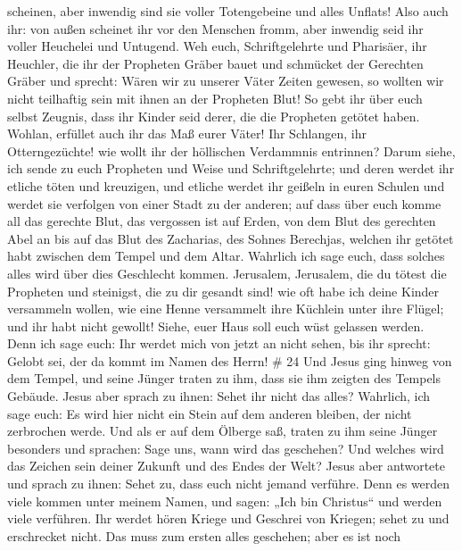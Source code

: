 scheinen, aber inwendig sind sie voller Totengebeine und alles Unflats!
 Also auch ihr: von außen scheinet ihr vor den Menschen
fromm, aber inwendig seid ihr voller Heuchelei und Untugend.
 Weh euch, Schriftgelehrte und Pharisäer, ihr Heuchler, die
ihr der Propheten Gräber bauet und schmücket der Gerechten Gräber
 und sprecht: Wären wir zu unserer Väter Zeiten gewesen, so
wollten wir nicht teilhaftig sein mit ihnen an der Propheten Blut!
 So gebt ihr über euch selbst Zeugnis, dass ihr Kinder seid
derer, die die Propheten getötet haben.  Wohlan, erfüllet
auch ihr das Maß eurer Väter!  Ihr Schlangen, ihr
Otterngezüchte! wie wollt ihr der höllischen Verdammnis entrinnen?
 Darum siehe, ich sende zu euch Propheten und Weise und
Schriftgelehrte; und deren werdet ihr etliche töten und kreuzigen, und
etliche werdet ihr geißeln in euren Schulen und werdet sie verfolgen von
einer Stadt zu der anderen;  auf dass über euch komme all
das gerechte Blut, das vergossen ist auf Erden, von dem Blut des
gerechten Abel an bis auf das Blut des Zacharias, des Sohnes Berechjas,
welchen ihr getötet habt zwischen dem Tempel und dem Altar.
 Wahrlich ich sage euch, dass solches alles wird über dies
Geschlecht kommen.  Jerusalem, Jerusalem, die du tötest die
Propheten und steinigst, die zu dir gesandt sind! wie oft habe ich deine
Kinder versammeln wollen, wie eine Henne versammelt ihre Küchlein unter
ihre Flügel; und ihr habt nicht gewollt!  Siehe, euer Haus
soll euch wüst gelassen werden.  Denn ich sage euch: Ihr
werdet mich von jetzt an nicht sehen, bis ihr sprecht: Gelobt sei, der
da kommt im Namen des Herrn! \# 24  Und Jesus ging hinweg
von dem Tempel, und seine Jünger traten zu ihm, dass sie ihm zeigten des
Tempels Gebäude.  Jesus aber sprach zu ihnen: Sehet ihr
nicht das alles? Wahrlich, ich sage euch: Es wird hier nicht ein Stein
auf dem anderen bleiben, der nicht zerbrochen werde.  Und
als er auf dem Ölberge saß, traten zu ihm seine Jünger besonders und
sprachen: Sage uns, wann wird das geschehen? Und welches wird das
Zeichen sein deiner Zukunft und des Endes der Welt?  Jesus
aber antwortete und sprach zu ihnen: Sehet zu, dass euch nicht jemand
verführe.  Denn es werden viele kommen unter meinem Namen,
und sagen: „Ich bin Christus`` und werden viele verführen. 
Ihr werdet hören Kriege und Geschrei von Kriegen; sehet zu und
erschrecket nicht. Das muss zum ersten alles geschehen; aber es ist noch
